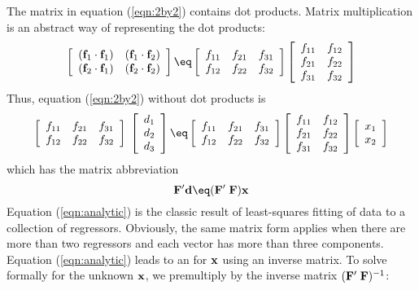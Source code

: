 The matrix in equation (\ref{eqn:2by2})
contains dot products.
Matrix multiplication is an abstract way of representing the dot products:
\begin{equation}
\left[ 
\begin{array}{ccc}
  (\ff_1 \cdot \ff_1) & (\ff_1 \cdot \ff_2)  \\
  (\ff_2 \cdot \ff_1) & (\ff_2 \cdot \ff_2)  \end{array} \right] 
 \eq
\left[ 
\begin{array}{ccc}
  f_{11} & f_{21} & f_{31}  \\
  f_{12} & f_{22} & f_{32}  \end{array} \right] 
\left[ 
\begin{array}{ccc}
  f_{11} & f_{12}  \\
  f_{21} & f_{22}  \\
  f_{31} & f_{32}  \end{array} \right] 
\label{eqn:covmat}
\end{equation}
Thus, equation (\ref{eqn:2by2}) without dot products is
\begin{equation}
\left[ 
\begin{array}{ccc}
  f_{11} & f_{21} & f_{31}  \\
  f_{12} & f_{22} & f_{32}  \end{array} \right] 
\; \left[ 
\begin{array}{c}
  d_1 \\ 
  d_2 \\ 
  d_3 \end{array} \right]
\eq
\left[ 
\begin{array}{ccc}
  f_{11} & f_{21} & f_{31}  \\
  f_{12} & f_{22} & f_{32}  \end{array} \right] 
\left[ 
\begin{array}{ccc}
  f_{11} & f_{12}  \\
  f_{21} & f_{22}  \\
  f_{31} & f_{32}  \end{array} \right] 
\left[ 
\begin{array}{ccc}
  x_1  \\
  x_2  \end{array} \right] 
\end{equation}
which has the matrix abbreviation
\begin{equation}
\bold F' \dd \eq ( \bold F' \; \bold F )  \bold x
\label{eqn:analytic}
\end{equation}
Equation
(\ref{eqn:analytic})
is the classic result of least-squares
fitting of data to a collection of regressors.
Obviously, the same matrix form applies when there are more than
two regressors and each vector has more than three components.
Equation
(\ref{eqn:analytic})
leads to an  for $\bold x$
using an inverse matrix.
To solve formally for the unknown $\bold x$,
we premultiply by the inverse matrix $( \bold F' \; \bold F )^{-1}$:

